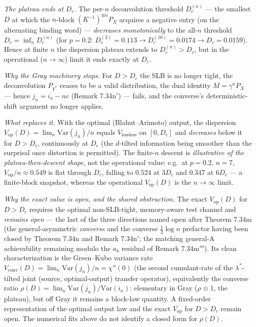 \documentclass[
]{article}
\begin{document}
\emph{The plateau ends at $D_c$.} The per-$n$ deconvolution threshold $D_c^{(n)}$
--- the smallest $D$ at which the $n$-block $(K^{-1})^{\otimes n}P_X$ acquires a
negative entry (on the alternating binding word) --- \emph{decreases
monotonically} to the all-$n$ threshold $D_c=\inf_n D_c^{(n)}$ (for $p=0.2$:
$D_c^{(2)}=0.113\to D_c^{(10)}=0.0174\to D_c=0.0159$). Hence at finite $n$ the
dispersion plateau extends to $D_c^{(n)}>D_c$, but in the operational
($n\to\infty$) limit it ends exactly at $D_c$.

\emph{Why the Gray machinery stops.} For $D>D_c$ the SLB is no longer tight, the
deconvolution $P_{Y^*}$ ceases to be a valid distribution, the dual identity
$M=\gamma^n P_X$ --- hence $j_n=i_n-nc$ (Remark 7.34n$'$) --- fails, and the
converse's deterministic-shift argument no longer applies.

\emph{What replaces it.} With the optimal (Blahut--Arimoto) output, the
dispersion $V_{\mathrm{op}}(D)=\lim_n\mathrm{Var}(j_n)/n$ equals
$V_{\mathrm{lossless}}$ on $[0,D_c]$ and \emph{decreases} below it for $D>D_c$,
continuously at $D_c$ (the $d$-tilted information being smoother than the
surprisal once distortion is permitted). The finite-$n$ descent is
\emph{illustrative of the plateau-then-descent shape}, not the operational value:
e.g.\ at $p=0.2$, $n=7$, $V_{\mathrm{op}}/n\approx0.549$ is flat through $D_c$,
falling to $0.524$ at $3D_c$ and $0.347$ at $6D_c$ --- a finite-block snapshot,
whereas the operational $V_{\mathrm{op}}(D)$ is the $n\to\infty$ limit.

\emph{Why the exact value is open, and the shared obstruction.} The exact
$V_{\mathrm{op}}(D)$ for $D>D_c$ requires the optimal non-SLB-tight, memory-aware
test channel and \emph{remains open} --- the last of the three directions named
open after Theorem 7.34m (the general-asymmetric \emph{converse} and the
converse $\tfrac12\log n$ prefactor having been closed by Theorem 7.34n and
Remark 7.34n$'$; the matching general-A achievability remaining modulo the $a_k$
residual of Remark 7.34m$'''$). Its clean
characterization is the Green--Kubo variance rate
$V_{\mathrm{conv}}(D)=\lim_n\mathrm{Var}(j_n)/n=\chi''(0)$ (the second
cumulant-rate of the $\lambda^*$-tilted joint (source, optimal-output) transfer
operator), equivalently the converse ratio $\rho(D)=\lim_n\mathrm{Var}(j_n)/
\mathrm{Var}(i_n)$: elementary in Gray ($\rho\equiv1$, the plateau), but off Gray
it remains a block-law quantity. A fixed-order representation of the optimal
output law and the exact $V_{\mathrm{op}}$ for $D>D_c$ remain open. The numerical
fits above do not identify a closed form for $\rho(D)$.
\end{document}
